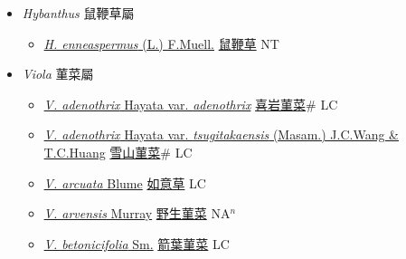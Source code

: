 
  \begin{itemize}
 \item[] \textit{Hybanthus} 鼠鞭草屬
                    
  \begin{itemize}
        \item[] \href{http://www.theplantlist.org/tpl1.1/search?q=Hybanthus+enneaspermus}{\textit{H. enneaspermus} (L.) F.Muell.}   \href{\detokenize{http://taibnet.sinica.edu.tw/chi/taibnet_species_list.php?T2=鼠鞭草&T2_new_value=true&fr=y}}{鼠鞭草} NT
  \end{itemize}
 \item[] \textit{Viola} 菫菜屬
                    
  \begin{itemize}
        \item[] \href{http://www.theplantlist.org/tpl1.1/search?q=Viola+adenothrix+var.+adenothrix}{\textit{V. adenothrix} Hayata var. \textit{adenothrix}}   \href{\detokenize{http://taibnet.sinica.edu.tw/chi/taibnet_species_list.php?T2=喜岩菫菜&T2_new_value=true&fr=y}}{喜岩菫菜}\# LC
        \item[] \href{http://www.theplantlist.org/tpl1.1/search?q=Viola+adenothrix+var.+tsugitakaensis}{\textit{V. adenothrix} Hayata var. \textit{tsugitakaensis} (Masam.) J.C.Wang \& T.C.Huang}   \href{\detokenize{http://taibnet.sinica.edu.tw/chi/taibnet_species_list.php?T2=雪山菫菜&T2_new_value=true&fr=y}}{雪山菫菜}\# LC
        \item[] \href{http://www.theplantlist.org/tpl1.1/search?q=Viola+arcuata}{\textit{V. arcuata} Blume}   \href{\detokenize{http://taibnet.sinica.edu.tw/chi/taibnet_species_list.php?T2=如意草&T2_new_value=true&fr=y}}{如意草} LC
        \item[] \href{http://www.theplantlist.org/tpl1.1/search?q=Viola+arvensis}{\textit{V. arvensis} Murray}   \href{\detokenize{http://taibnet.sinica.edu.tw/chi/taibnet_species_list.php?T2=野生菫菜&T2_new_value=true&fr=y}}{野生菫菜} NA$^n$
        \item[] \href{http://www.theplantlist.org/tpl1.1/search?q=Viola+betonicifolia}{\textit{V. betonicifolia} Sm.}   \href{\detokenize{http://taibnet.sinica.edu.tw/chi/taibnet_species_list.php?T2=箭葉菫菜&T2_new_value=true&fr=y}}{箭葉菫菜} LC

\end{itemize}
\end{itemize}
